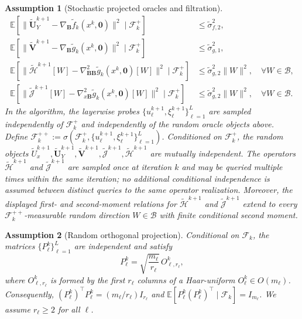 \documentclass{pkumelon}
\theoremstyle{plain}
\newtheorem{assumption}{Assumption}
\newcommand{\E}{\mathbb{E}}
\begin{document}
\begin{assumption}[Stochastic projected oracles and filtration]
\begin{equation*}
\begin{aligned}
\E [ \| \tilde{\boldsymbol U}_Y^{k+1} - \nabla_{\boldsymbol B} \tilde f_k(x^k, \mathbf 0) \|^2 \mid \mathcal F_k^+ ] &\leq \tilde{\sigma}_{f,2}^2,\\
\E [ \| \tilde{\boldsymbol V}^{k+1} - \nabla_{\boldsymbol B} \tilde g_k(x^k, \mathbf 0) \|^2 \mid \mathcal F_k^+ ] &\leq \tilde{\sigma}_{g,1}^2,\\
\E [ \| \tilde{\mathcal H}^{k+1}[W] - \nabla_{\boldsymbol B\boldsymbol B}^2 \tilde g_k(x^k, \mathbf 0)[W] \|^2 \mid \mathcal F_k^+ ] &\leq \tilde{\sigma}_{g,2}^2\|W\|^2, \quad \forall W\in\mathcal B,\\
\E [ \| \tilde{\mathcal J}^{k+1}[W] - \nabla_{x\boldsymbol B}^2 \tilde g_k(x^k, \mathbf 0)[W] \|^2 \mid \mathcal F_k^+ ] &\leq \tilde{\sigma}_{g,2}^2\|W\|^2, \quad \forall W\in\mathcal B.
\end{aligned}
\end{equation*}
In the algorithm, the layerwise probes $\{u_\ell^{k+1},\xi_\ell^{k+1}\}_{\ell=1}^L$ are sampled independently of $\mathcal F_k^+$ and independently of the random oracle objects above. Define $\mathcal F_k^{++}:=\sigma\!\left(\mathcal F_k^+,\{u_\ell^{k+1},\xi_\ell^{k+1}\}_{\ell=1}^L\right)$. Conditioned on $\mathcal F_k^+$, the random objects $\tilde U_x^{k+1},\tilde{\boldsymbol U}_Y^{k+1},\tilde{\boldsymbol V}^{k+1},\tilde{\mathcal J}^{k+1},\tilde{\mathcal H}^{k+1}$ are mutually independent. The operators $\tilde{\mathcal H}^{k+1}$ and $\tilde{\mathcal J}^{k+1}$ are sampled once at iteration $k$ and may be queried multiple times within the same iteration; no additional conditional independence is assumed between distinct queries to the same operator realization. Moreover, the displayed first- and second-moment relations for $\tilde{\mathcal H}^{k+1}$ and $\tilde{\mathcal J}^{k+1}$ extend to every $\mathcal F_k^{++}$-measurable random direction $W\in\mathcal B$ with finite conditional second moment.
\end{assumption}

\begin{assumption}[Random orthogonal projection]\label{as:A3-1}
Conditional on $\mathcal F_k$, the matrices $\{P_\ell^k\}_{\ell=1}^L$ are independent and satisfy
\begin{equation*}
P_\ell^k=\sqrt{\frac{m_\ell}{r_\ell}}\,O_{\ell,r_\ell}^k,
\end{equation*}
where $O_{\ell,r_\ell}^k$ is formed by the first $r_\ell$ columns of a Haar-uniform $O_\ell^k\in O(m_\ell)$. Consequently, ${(P_\ell^k)}^{\top} P_\ell^k=(m_\ell/r_\ell)I_{r_\ell}$ and $\E[P_\ell^k{(P_\ell^k)}^\top\mid\mathcal F_k]=I_{m_\ell}$. We assume $r_\ell\ge 2$ for all $\ell$.
\end{assumption}
\end{document}
